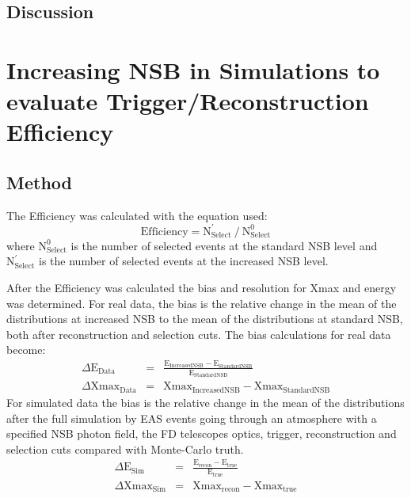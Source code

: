 \subsection{Discussion}

\section{Increasing NSB in Simulations to evaluate Trigger/Reconstruction Efficiency}

\subsection{Method}
 The Efficiency was calculated with the equation used:
\begin{equation}
\mathrm{Efficiency} = \mathrm{N}^{'}_{\mathrm{Select}} \ / \ \mathrm{N}^0_{\mathrm{Select}}
\end{equation}
where $\mathrm{N}^{0}_{\mathrm{Select}}$ is the number of selected events at the standard NSB level and $\mathrm{N}^{'}_{\mathrm{Select}}$ is the number of selected events at the increased NSB
level. 

After the Efficiency was calculated the bias and resolution for Xmax and energy was determined. For real data, the bias is the relative change in the mean of the distributions at increased NSB to the mean of the distributions at standard NSB, both after reconstruction and selection cuts. The bias calculations for real data become:
\begin{eqnarray}
\Delta \mathrm{E}_{\mathrm{Data}} &=& \frac{\mathrm{E}_{\mathrm{IncreasedNSB}} - \mathrm{E}_{\mathrm{StandardNSB}}}{\mathrm{E}_{\mathrm{StandardNSB}}} \label{eq:energybias_data} \\
\Delta \mathrm{Xmax}_{\mathrm{Data}} &=& \mathrm{Xmax}_{\mathrm{IncreasedNSB}} - \mathrm{Xmax}_{\mathrm{StandardNSB}}\label{eq:xmaxbias_data}
\end{eqnarray} 
For simulated data the bias is the relative change in the mean of the distributions after the full simulation by EAS events going through an atmosphere with a specified NSB photon field, the FD telescopes optics, trigger, reconstruction and selection cuts compared with Monte-Carlo truth.
\begin{eqnarray}
\Delta \mathrm{E}_{\mathrm{Sim}} &=& \frac{\mathrm{E}_{\mathrm{recon}} - \mathrm{E}_{\mathrm{true}}}{\mathrm{E}_{\mathrm{true}}}  \label{eq:energybias_sim} \\
\Delta \mathrm{Xmax}_{\mathrm{Sim}} &=& \mathrm{Xmax}_{\mathrm{recon}} - \mathrm{Xmax}_{\mathrm{true}} \label{eq:xmaxbias_sim}
\end{eqnarray}
 

